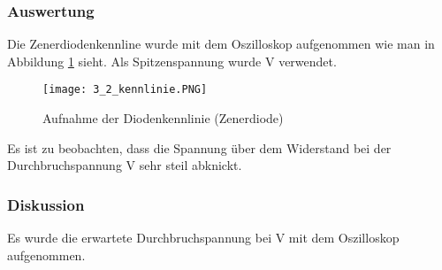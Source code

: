 \documentclass[12pt,a4paper]{article}
\begin{document}
\subsubsection{Auswertung}
Die Zenerdiodenkennline wurde mit dem Oszilloskop aufgenommen wie man in Abbildung \ref{fig:3.2_Aufnahme_Diodenkennlinie} sieht. Als Spitzenspannung wurde \unit[30]{V} verwendet.
\begin{figure}[H] 
  \centering
    \texttt{[image: 3\_2\_kennlinie.PNG]}
  	\caption[Aufnahme der Diodenkennlinie (Zenerdiode)]{Aufnahme der Diodenkennlinie (Zenerdiode)}
  \label{fig:3.2_Aufnahme_Diodenkennlinie}
\end{figure}
Es ist zu beobachten, dass die Spannung über dem Widerstand bei der Durchbruchspannung \unit[5,1]{V} sehr steil abknickt.
\subsubsection{Diskussion}
Es wurde die erwartete Durchbruchspannung bei \unit[5,1]{V} mit dem Oszilloskop aufgenommen. 
\end{document}
